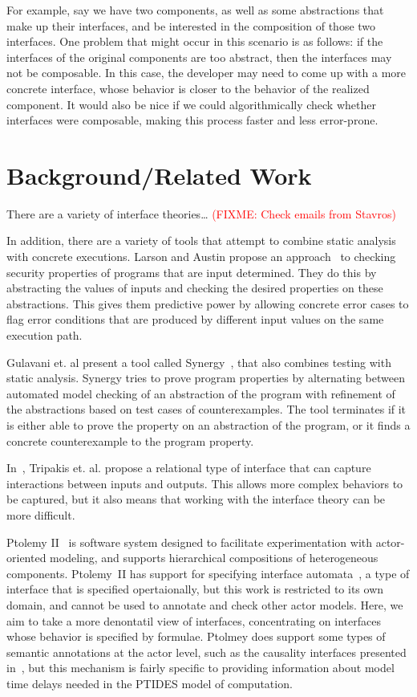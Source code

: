 \documentclass[preprint,11pt]{sigplanconf}
\newcommand{\fixme}[1]{\textcolor{red}{(FIXME: #1)}}
\begin{document}
For example, say we have two components, as well as some abstractions that
make up their interfaces, and be interested in the composition of those two
interfaces. One problem that might occur in this scenario is as follows: if the
interfaces of the original components are too abstract, then the interfaces
may not be composable. In this case, the developer may need to come up with a
more concrete interface, whose behavior is closer to the behavior of the
realized component. It would also be nice if we could algorithmically check
whether interfaces were composable, making this process faster and less
error-prone.

\section{Background/Related Work}
There are a variety of interface theories\ldots
\fixme{Check emails from Stavros} %

In addition, there are a variety of tools that attempt to combine static analysis
with concrete executions.
%
Larson and Austin propose an approach~\cite{larsonAustin:2003:coverageDetection} 
to checking security properties of programs that are input determined.  They do
this by abstracting the values of inputs and checking the desired properties on
these abstractions. This gives them predictive power by allowing concrete error
cases to flag error conditions that are produced by different input values on the
same execution path.

Gulavani et. al present a tool called Synergy~\cite{gulavani:synergy}, that
also combines testing with static analysis.  Synergy tries to prove program
properties by alternating between automated model checking of an abstraction of
the program with refinement of the abstractions based on test cases of
counterexamples.  The tool terminates if it is either able to prove the property
on an abstraction of the program, or it finds a concrete counterexample to the
program property.

In~\cite{relationalInterfaces}, Tripakis et. al. propose a relational type of
interface that can capture interactions between inputs and outputs.
This allows more complex behaviors to be captured, but it also means that
working with the interface theory can be more difficult.

Ptolemy II~\cite{ptII} is software system designed to facilitate experimentation
with actor-oriented modeling, and supports hierarchical compositions of
heterogeneous components.  Ptolemy~II has support for specifying interface
automata~\cite{Alfaro01interfaceautomata}, a type of interface that is specified
opertaionally, but this work is restricted to its own domain, and cannot be used
to annotate and check other actor models. Here, we aim to take a more denontatil
view of interfaces, concentrating on interfaces whose behavior is specified by
formulae. Ptolmey does support some types of semantic annotations at the actor
level, such as the causality interfaces presented
in~\cite{ZhouLee08_CausalityInterfacesForActorNetworks}, but this mechanism is
fairly specific to providing information about model time delays needed in the
PTIDES model of computation.
\end{document}
